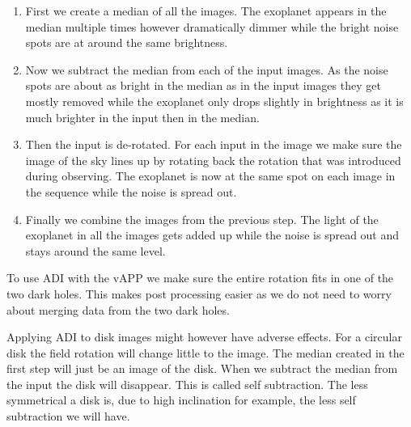 \begin{enumerate}
    \item First we create a median of all the images. The exoplanet appears in the median multiple times however dramatically dimmer while the bright noise spots are at around the same brightness.
    \item Now we subtract the median from each of the input images. As the noise spots are about as bright in the median as in the input images they get mostly removed while the exoplanet only drops slightly in brightness as it is much brighter in the input then in the median.
    \item Then the input is de-rotated. For each input in the image we make sure the image of the sky lines up by rotating back the rotation that was introduced during observing. The exoplanet is now at the same spot on each image in the sequence while the noise is spread out.
    \item Finally we combine the images from the previous step. The light of the exoplanet in all the images gets added up while the noise is spread out and stays around the same level.
\end{enumerate}

To use \ac{ADI} with the \ac{vAPP} we make sure the entire rotation fits in one of the two dark holes. This makes post processing easier as we do not need to worry about merging data from the two dark holes. 

Applying \ac{ADI} to disk images might however have adverse effects. For a circular disk the field rotation will change little to the image. The median created in the first step will just be an image of the disk. When we subtract the median from the input the disk will disappear. This is called self subtraction. The less symmetrical a disk is, due to high inclination for example, the less self subtraction we will have.
